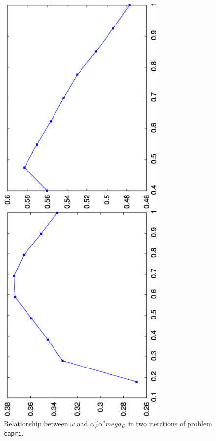 \begin{figure}[ht]
\centering
  \begin{minipage}[t]{0.49\textwidth}
  \includegraphics[width=0.73\textwidth,angle=-90]{figures/alphaomega-1.eps}
  \end{minipage} 
  \hfill
  \begin{minipage}[t]{0.49\textwidth}
  \includegraphics[width=0.73\textwidth,angle=-90]{figures/alphaomega-2.eps}
  \end{minipage}
  \caption{Relationship between $\omega$ and $\alpha^\omega_P\alpha^omega_D$
           in two iterations of problem {\tt capri}.}
  \label{fig:alphaomega}
\end{figure}

